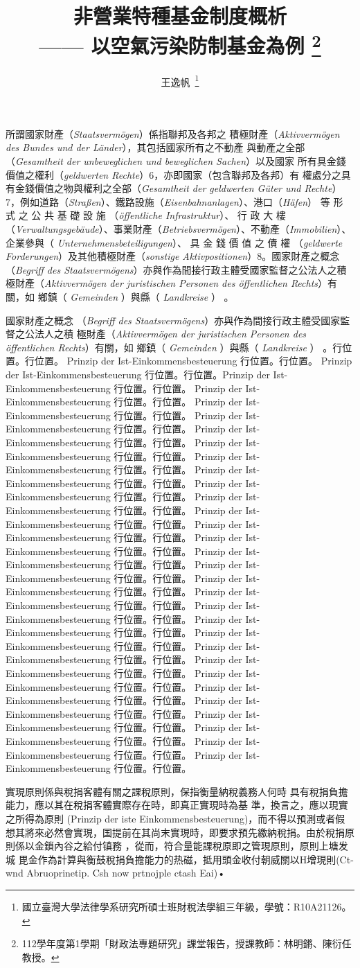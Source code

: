 \documentclass[14pt,a4paper]{article}
\author{王逸帆\,
\thanks{國立臺灣大學法律學系研究所碩士班財稅法學組三年級，學號：R10A21126。}
\vspace{-60em}
}
\date{}
\title{非營業特種基金制度概析
\\  \large —— 以空氣污染防制基金為例
\thanks{
  112學年度第1學期「財政法專題研究」課堂報告，授課教師：林明鏘、陳衍任教授。}}
\begin{document}
所謂國家財產（\textit{Staatsvermögen}）係指聯邦及各邦之
積極財產（\textit{Aktivvermögen des Bundes und der Länder}），其包括國家所有之不動產
與動產之全部（\textit{Gesamtheit der unbeweglichen und beweglichen Sachen}）以及國家
所有具金錢價值之權利（\textit{geldwerten Rechte}）6，亦即國家（包含聯邦及各邦）有
權處分之具有金錢價值之物與權利之全部（\textit{Gesamtheit der geldwerten Güter und
Rechte}）7，例如道路（\textit{Straßen}）、鐵路設施（\textit{Eisenbahnanlagen}）、港口（\textit{Häfen}）
等 形 式 之 公 共 基 礎 設 施 （\textit{öffentliche Infrastruktur}）、 行 政 大 樓
（\textit{Verwaltungsgebäude}）、事業財產（\textit{Betriebsvermögen}）、不動產（\textit{Immobilien}）、
企業參與（ \textit{Unternehmensbeteiligungen}）、 具 金 錢 價 值 之 債 權 （\textit{geldwerte
Forderungen}）及其他積極財產（\textit{sonstige Aktivpositionen}）8。國家財產之概念
（\textit{Begriff des Staatsvermögens}）亦與作為間接行政主體受國家監督之公法人之積
極財產（\textit{Aktivvermögen der juristischen Personen des öffentlichen Rechts}）有關，如
鄉鎮（ \textit{Gemeinden} ）與縣（ \textit{Landkreise} ） 。

國家財產之概念
（\textit{Begriff des Staatsvermögens}）亦與作為間接行政主體受國家監督之公法人之積
極財產（\textit{Aktivvermögen der juristischen Personen des öffentlichen Rechts}）有關，如
鄉鎮（ \textit{Gemeinden} ）與縣（ \textit{Landkreise} ） 。行位置。行位置。
Prinzip der Ist-Einkommensbesteuerung 行位置。行位置。
Prinzip der Ist-Einkommensbesteuerung 行位置。行位置。Prinzip der Ist-Einkommensbesteuerung 行位置。行位置。
Prinzip der Ist-Einkommensbesteuerung 行位置。行位置。
Prinzip der Ist-Einkommensbesteuerung 行位置。行位置。
Prinzip der Ist-Einkommensbesteuerung 行位置。行位置。
Prinzip der Ist-Einkommensbesteuerung 行位置。行位置。
Prinzip der Ist-Einkommensbesteuerung 行位置。行位置。
Prinzip der Ist-Einkommensbesteuerung 行位置。行位置。
Prinzip der Ist-Einkommensbesteuerung 行位置。行位置。
Prinzip der Ist-Einkommensbesteuerung 行位置。行位置。
Prinzip der Ist-Einkommensbesteuerung 行位置。行位置。
Prinzip der Ist-Einkommensbesteuerung 行位置。行位置。
Prinzip der Ist-Einkommensbesteuerung 行位置。行位置。
Prinzip der Ist-Einkommensbesteuerung 行位置。行位置。
Prinzip der Ist-Einkommensbesteuerung 行位置。行位置。
Prinzip der Ist-Einkommensbesteuerung 行位置。行位置。
Prinzip der Ist-Einkommensbesteuerung 行位置。行位置。
Prinzip der Ist-Einkommensbesteuerung 行位置。行位置。
Prinzip der Ist-Einkommensbesteuerung 行位置。行位置。
Prinzip der Ist-Einkommensbesteuerung 行位置。行位置。
Prinzip der Ist-Einkommensbesteuerung 行位置。行位置。
Prinzip der Ist-Einkommensbesteuerung 行位置。行位置。
Prinzip der Ist-Einkommensbesteuerung 行位置。行位置。
Prinzip der Ist-Einkommensbesteuerung 行位置。行位置。
Prinzip der Ist-Einkommensbesteuerung 行位置。行位置。
Prinzip der Ist-Einkommensbesteuerung 行位置。行位置。
Prinzip der Ist-Einkommensbesteuerung 行位置。行位置。
Prinzip der Ist-Einkommensbesteuerung 行位置。行位置。
Prinzip der Ist-Einkommensbesteuerung 行位置。行位置。
Prinzip der Ist-Einkommensbesteuerung 行位置。行位置。



實現原則係與稅捐客體有關之課稅原則，保指衡量納稅義務人何時
具有稅捐負擔能力，應以其在稅捐客體實際存在時，即真正實現時為基
準，換言之，應以現實之所得為原則 (Prinzip der iste
Einkommensbesteuerung)，而不得以預測或者假想其將來必然會實現，国提前在其尚末實現時，即要求預先繳納稅捐。由於稅捐原則係以金鎖內谷之給付镇務 ，從而，符合量能課稅原即之管現原則，原則上塘发城
毘金作為計算與衡鼓稅捐負擔能力的热磁，抵用頭金收付朝威關以H增現則(Ct- wnd Abruoprinetip. Csh now prtnojple ctash Eai)•
\end{document}
